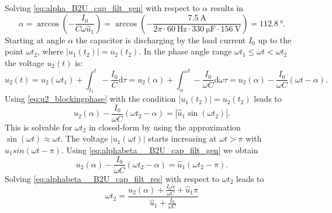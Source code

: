 \begin{solutionblock}
\begin{equation}
    \end{equation}    
    Solving \eqref{eq:alpha_B2U_cap_filt_gen} with respect to $\alpha$ results in
    \begin{equation}
        \alpha = \arccos\left(-\frac{I_\mathrm{0}}{C\omega \hat{u}_1}\right) = 
        \arccos(-\frac{\SI{7.5}{\ampere}}{2 \pi \cdot \SI{60}{\hertz} \cdot \SI{330}{\micro\farad} \cdot \SI{156}{\volt}}) = \SI{112.8}{\degree}.
        \label{eq:alpha_B2U_cap_filt_res}
    \end{equation}    
    Starting at angle $\alpha$ the capacitor is discharging by the load current $I_\mathrm{0}$ up to the point 
    $\omega t_2$, where $\left| u_\mathrm{1}(t_2) \right|=u_\mathrm{2}(t_2)$.
    In the phase angle range $\omega t_1 \leq \omega t < \omega t_2$ the voltage $u_\mathrm{2}(t)$ is:
    \begin{equation}
        u_\mathrm{2}(t) = u_2(\omega t_1) + \int_{t_1}^t -\frac{I_0}{C} \mathrm{d} \tau 
        = u_\mathrm{2}(\alpha) + \int_{\alpha}^{\omega t} -\frac{I_0}{\omega C} \mathrm{d} \omega \tau
        =  u_\mathrm{2}(\alpha) - \frac{I_\mathrm{0}}{\omega C} (\omega t - \alpha).
        \label{eq:u2_blockingphase}
    \end{equation}
    Using \eqref{eq:u2_blockingphase} with the condition $\left| u_\mathrm{1}(t_\mathrm{2}) \right|=u_\mathrm{2}(t_\mathrm{2})$ leads to
    \begin{equation}
        u_\mathrm{2}(\alpha) - \frac{I_\mathrm{0}}{\omega C} (\omega t_\mathrm{2} - \alpha) = \left| \hat{u}_\mathrm{1}\sin(\omega t_\mathrm{2})\right|.
        \label{eq:alphabeta__B2U_cap_filt_gen}
    \end{equation}
    This is solvable for $\omega t_\mathrm{2}$ in closed-form by using the approximation $\sin(\omega t) \approx \omega t$. The voltage 
    $\left| u_\mathrm{1}(\omega t)\right|$ starts increasing at $\omega t > \pi$ with $\hat{u}_\mathrm{1} sin(\omega t - \pi)$.
    Using  \eqref{eq:alphabeta__B2U_cap_filt_gen} we obtain
    \begin{equation}
        u_2(\alpha) - \frac{I_\mathrm{0}}{\omega C} (\omega t_\mathrm{2} - \alpha) = \hat{u}_\mathrm{1}(\omega t_\mathrm{2} - \pi).
        \label{eq:alphabeta__B2U_cap_filt_res}
    \end{equation}
    Solving \eqref{eq:alphabeta__B2U_cap_filt_res} with respect to $\omega t_\mathrm{2}$ leads to
    \begin{equation}
        \omega t_\mathrm{2} = \frac{u_2(\alpha) + \frac{I_\mathrm{0}\alpha}{\omega C} + \hat{u}_\mathrm{1} \pi}{\hat{u}_\mathrm{1} + \frac{I_\mathrm{0}}{\omega C}}

\end{equation}
\end{solutionblock}
